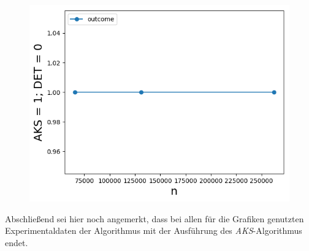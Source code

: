 \begin{figure}[H]
\begin{minipage}[t]{.30\textwidth}
        \includegraphics[width=\textwidth]{pictures/med_algo_theo28_case.png}
    \end{minipage}
    \vspace*{-0.1cm}
    \label{fig: med_theo28_rem}
\end{figure}


\noindent
Abschließend sei hier noch angemerkt, dass bei allen für die Grafiken genutzten Experimentaldaten der Algorithmus \RM mit der Ausführung des \textit{AKS}-Algorithmus endet.




